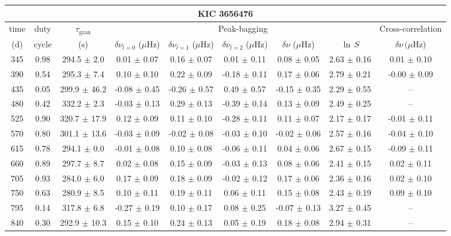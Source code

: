 \documentclass[twocolumn]{aastex61}%
\begin{document}
\begin{table*}[ht]\centering\fontsize{9.}{7.}\selectfont
\begin{tabular}{ccc|ccccc|c}
\multicolumn{9}{c}{KIC 3656476}\\ \hline\hline
time & duty & $\tau_\text{gran}$ &\multicolumn{5}{c|}{Peak-bagging}&Cross-correlation\\
(d)& cycle & (s)&$\delta\nu_{l=0}$ ($\mu$Hz) & $\delta\nu_{l=1}$ ($\mu$Hz) & $\delta\nu_{l=2}$ ($\mu$Hz) & $\delta\nu$ ($\mu$Hz)& $\ln\,S$ & $\delta\nu\,(\mu$Hz)\\\hline
345 & 0.98 & 294.5 $\pm$ 2.0 & 0.01 $\pm$ 0.07 & 0.16 $\pm$ 0.07 & 0.01 $\pm$ 0.11 & 0.08 $\pm$ 0.05 & 2.63 $\pm$ 0.16 & 0.01 $\pm$ 0.10\\
390 & 0.54 & 295.3 $\pm$ 7.4 & 0.10 $\pm$ 0.10 & 0.22 $\pm$ 0.09 & -0.18 $\pm$ 0.11 & 0.17 $\pm$ 0.06 & 2.79 $\pm$ 0.21 & -0.00 $\pm$ 0.09\\
435 & 0.05 & 299.9 $\pm$ 46.2 & -0.08 $\pm$ 0.45 & -0.26 $\pm$ 0.57 & 0.49 $\pm$ 0.57 & -0.15 $\pm$ 0.35 & 2.29 $\pm$ 0.55 & --\\
480 & 0.42 & 332.2 $\pm$ 2.3 & -0.03 $\pm$ 0.13 & 0.29 $\pm$ 0.13 & -0.39 $\pm$ 0.14 & 0.13 $\pm$ 0.09 & 2.49 $\pm$ 0.25 & --\\
525 & 0.90 & 320.7 $\pm$ 17.9 & 0.12 $\pm$ 0.09 & 0.11 $\pm$ 0.10 & -0.28 $\pm$ 0.11 & 0.11 $\pm$ 0.07 & 2.17 $\pm$ 0.17 & -0.01 $\pm$ 0.11\\
570 & 0.80 & 301.1 $\pm$ 13.6 & -0.03 $\pm$ 0.09 & -0.02 $\pm$ 0.08 & -0.03 $\pm$ 0.10 & -0.02 $\pm$ 0.06 & 2.57 $\pm$ 0.16 & -0.04 $\pm$ 0.10\\
615 & 0.78 & 294.1 $\pm$ 0.0 & -0.01 $\pm$ 0.08 & 0.10 $\pm$ 0.08 & -0.06 $\pm$ 0.11 & 0.04 $\pm$ 0.06 & 2.67 $\pm$ 0.15 & -0.09 $\pm$ 0.11\\
660 & 0.89 & 297.7 $\pm$ 8.7 & 0.02 $\pm$ 0.08 & 0.15 $\pm$ 0.09 & -0.03 $\pm$ 0.13 & 0.08 $\pm$ 0.06 & 2.41 $\pm$ 0.15 & 0.02 $\pm$ 0.11\\
705 & 0.93 & 284.0 $\pm$ 6.0 & 0.17 $\pm$ 0.09 & 0.18 $\pm$ 0.09 & -0.02 $\pm$ 0.12 & 0.17 $\pm$ 0.06 & 2.36 $\pm$ 0.16 & 0.02 $\pm$ 0.10\\
750 & 0.63 & 280.9 $\pm$ 8.5 & 0.10 $\pm$ 0.11 & 0.19 $\pm$ 0.11 & 0.06 $\pm$ 0.11 & 0.15 $\pm$ 0.08 & 2.43 $\pm$ 0.19 & 0.09 $\pm$ 0.10\\
795 & 0.14 & 317.8 $\pm$ 6.8 & -0.27 $\pm$ 0.19 & 0.10 $\pm$ 0.17 & 0.08 $\pm$ 0.25 & -0.07 $\pm$ 0.13 & 3.27 $\pm$ 0.45 & --\\
840 & 0.30 & 292.9 $\pm$ 10.3 & 0.15 $\pm$ 0.10 & 0.24 $\pm$ 0.13 & 0.05 $\pm$ 0.19 & 0.18 $\pm$ 0.08 & 2.94 $\pm$ 0.31 & --\\

\end{tabular}
\end{table*}
\end{document}
